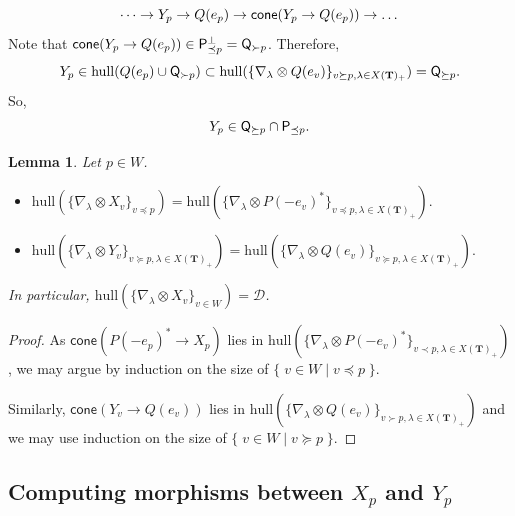 \documentclass[sn-mathphys-num]{sn-jnl}%
\newcommand{\D}{\mathcal D}
\newcommand{\subsetq}{\subset}
\newcommand{\hull}{{\mathrm{hull}}}
\newcommand{\cone}{{\mathsf{cone}}}
\newcommand{\bt}{\mathbf T}
\newtheorem{lemma}[theorem]{Lemma}
\theoremstyle{definition}
\begin{document}
\begin{equation}\label{eq:def_triang_Y_p}
\dots \rightarrow Y_p\rightarrow Q(e_p)\rightarrow {\sf cone}(Y_p\rightarrow Q(e_p))\rightarrow \dots 
\end{equation}
Note that ${\sf cone}(Y_p\rightarrow Q(e_p))\in {\sf P}_{\preceq p}^{\perp}=
{\sf Q}_{\succ p}$. Therefore, 
$$Y_p\in \hull( Q(e_p)\cup {\sf Q}_{\succ p})\subsetq\hull(\{\nabla_\lambda\otimes Q(e_v)\}_{v\succeq  p,\lambda\in X( \bt)_+})={\sf Q}_{\succeq p}.$$
So, \begin{equation}\label{eq:Y in Q and P}Y_p\in {\sf Q}_{\succeq p}\cap {\sf P}_{\preceq p} .
\end{equation}
\begin{lemma}\label{lem:samehull}Let $p\in W$.
\begin{itemize}
    \item $\hull(\{\nabla_\lambda\otimes X_v\}_{v\preceq p})=\hull(\{\nabla_\lambda\otimes P(-e_v)^*\}_{v\preceq  p,\lambda\in X( \bt)_+}).$


    
    \item $\hull(\{\nabla_\lambda\otimes Y_v\}_{v\succeq  p,\lambda\in X( \bt)_+})=\hull(\{\nabla_\lambda\otimes Q(e_v)\}_{v\succeq  p,\lambda\in X( \bt)_+}).$
\end{itemize}
In particular, $\hull(\{\nabla_\lambda\otimes X_v\}_{v\in W}) =\D$.
\end{lemma}


\begin{proof}
As $\cone(P(-e_p)^*\to X_p)$ lies in $\hull(\{\nabla_\lambda\otimes P(-e_v)^*\}_{v\prec  p,\lambda\in X( \bt)_+})$, we may argue by induction on the size of $\{\;v\in W\mid v\preceq p\;\}$. 

Similarly,
$\cone(Y_v\to Q(e_v))$ lies in $\hull(\{\nabla_\lambda\otimes Q(e_v)\}_{v\succ  p,\lambda\in X( \bt)_+})$ and we may use induction on the size of 
$\{\;v\in W\mid v\succeq p\;\}$.
\end{proof}



\subsection{Computing morphisms between $X_p$ and $Y_p$}\label{subsec:X_p-Y_p-morphisms}
\end{document}
